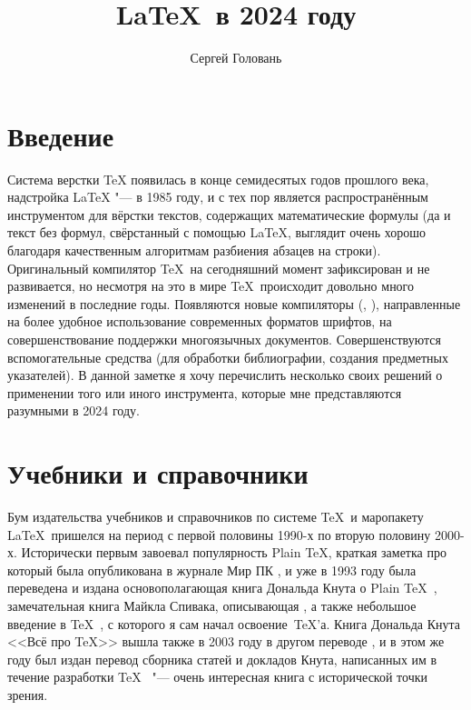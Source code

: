 \documentclass[a4paper,12pt,hyphens]{article}
\title{\sffamily\LaTeX\ в 2024 году}
\author{Сергей Головань}
\begin{document}
%
\vspace{-\baselineskip}%
\maketitle
{}%
\vspace{-\baselineskip}%
\tableofcontents

\clearpage
\section{Введение}
Система верстки \TeX{} появилась в конце семидесятых годов прошлого века,
надстройка \LaTeX{} "--- в 1985 году, и с тех пор является распространённым
инструментом для вёрстки текстов, содержащих математические формулы (да и текст
без формул, свёрстанный с помощью \LaTeX, выглядит очень хорошо благодаря
качественным алгоритмам разбиения абзацев на строки). Оригинальный компилятор
\TeX\ на сегодняшний момент зафиксирован и не развивается, но несмотря на это
в мире \TeX\ происходит довольно много изменений в последние годы. Появляются
новые компиляторы (\XeTeX{}, \LuaTeX{}), направленные
на более удобное использование
современных форматов шрифтов, на совершенствование поддержки многоязычных
документов. Совершенствуются вспомогательные средства (для обработки
библиографии, создания предметных указателей). В данной заметке я хочу
перечислить несколько своих решений о применении того или иного инструмента,
которые мне представляются разумными в 2024 году.

\section{Учебники и справочники}
Бум издательства учебников и справочников по системе \TeX\ и маропакету \LaTeX\ пришелся
на период с первой половины 1990-х по вторую половину 2000-х. Исторически первым завоевал
популярность Plain \TeX, краткая заметка про который была опубликована в журнале Мир ПК \parencite{vinogradov:1992},
и уже в 1993 году была переведена и издана основополагающая книга Дональда Кнута о Plain \TeX\ \parencite{knuth:1993},
замечательная книга Майкла Спивака, описывающая  \parencite{spivak:1993}, а также
небольшое введение в \TeX\ \parencite{evgrafov-evgrafov:1993}, с которого я сам начал освоение~\TeX'а.
Книга Дональда Кнута <<Всё про \TeX>> вышла также в 2003 году в другом переводе \parencite{knuth:2003a}, и в этом же году
был издан перевод сборника статей и докладов Кнута, написанных им в течение разработки \TeX\ \parencite{knuth:2003b} "---
очень интересная книга с исторической точки зрения.
\end{document}
